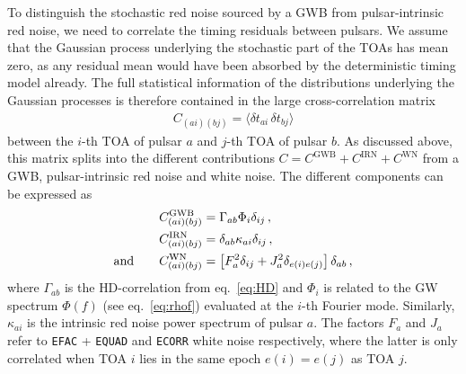 To distinguish the stochastic red noise sourced by a \ac{GWB} from pulsar-intrinsic red noise, we need to correlate  the timing residuals between pulsars. We assume that the Gaussian process underlying the stochastic part of the \acp{TOA} has mean zero, as any residual mean would have been absorbed by the deterministic timing model already. The full statistical information of the distributions underlying the Gaussian processes is therefore contained in the large cross-correlation matrix
\begin{align}
	C_{(ai)(bj)} = \langle \delta t_{ai} \, \delta t_{bj}\rangle
\end{align}
between the $i$-th \ac{TOA} of pulsar $a$ and $j$-th \ac{TOA} of pulsar $b$. As discussed above, this matrix splits into the different contributions $C = C^\text{GWB} + C^\text{IRN} + C^\text{WN}$ from a \ac{GWB}, pulsar-intrinsic red noise and white noise. The different components can be expressed as
\begin{subequations}
	\begin{align}
		C_{(ai)(bj)}^\text{GWB} &= \Gamma_{ab} \Phi_i \delta_{ij} \label{eq:C-GW} \, ,\\ 
		C_{(ai)(bj)}^\text{IRN} &= \delta_{ab} \kappa_{ai} \delta_{ij} \, , \\
		\text{and} \qquad C_{(ai)(bj)}^\text{WN} &= \left[  F_a^2 \delta_{ij} + J_a^2 \delta_{e(i) e(j)} \right] \delta_{ab} \, ,
	\end{align}
\end{subequations}
where $\Gamma_{ab}$ is the \ac{HD}-correlation from eq.~\eqref{eq:HD} and $\Phi_i$ is related to the \ac{GW} spectrum $\Phi(f)$ (see eq.~\eqref{eq:rhof}) evaluated at the $i$-th Fourier mode. Similarly, $\kappa_{ai}$ is the intrinsic red noise power spectrum of pulsar $a$. The factors $F_a$ and $J_a$ refer to \texttt{EFAC} + \texttt{EQUAD} and \texttt{ECORR} white noise respectively, where the latter is only correlated when \ac{TOA} $i$ lies in the same epoch $e(i) = e(j)$ as \ac{TOA} $j$.

